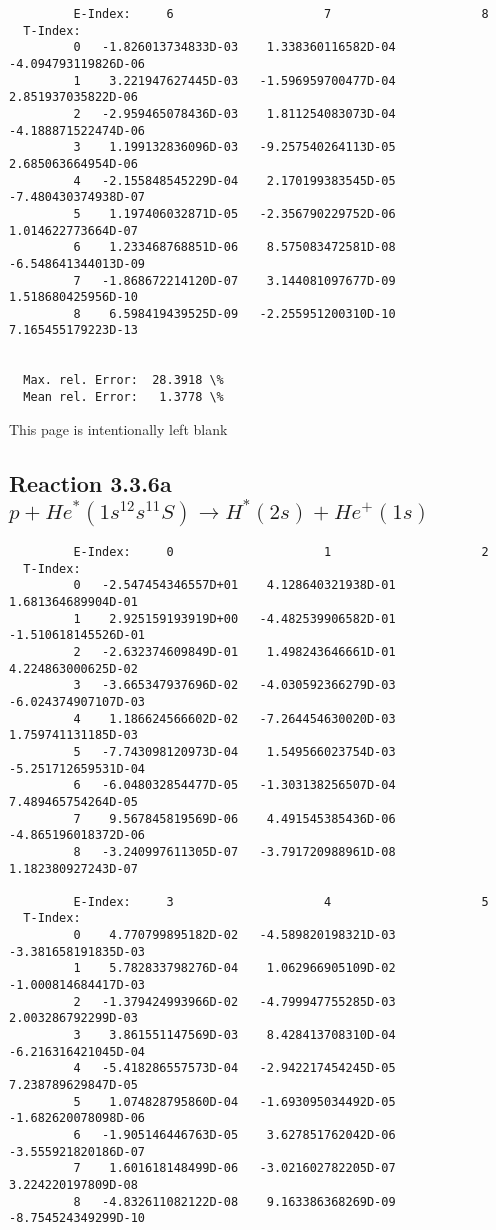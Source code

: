 \documentclass[12pt,dvipdfmx]{article}
\begin{document}
{\begin{small}
\begin{verbatim}
         E-Index:     6                     7                     8
  T-Index:
         0   -1.826013734833D-03    1.338360116582D-04   -4.094793119826D-06
         1    3.221947627445D-03   -1.596959700477D-04    2.851937035822D-06
         2   -2.959465078436D-03    1.811254083073D-04   -4.188871522474D-06
         3    1.199132836096D-03   -9.257540264113D-05    2.685063664954D-06
         4   -2.155848545229D-04    2.170199383545D-05   -7.480430374938D-07
         5    1.197406032871D-05   -2.356790229752D-06    1.014622773664D-07
         6    1.233468768851D-06    8.575083472581D-08   -6.548641344013D-09
         7   -1.868672214120D-07    3.144081097677D-09    1.518680425956D-10
         8    6.598419439525D-09   -2.255951200310D-10    7.165455179223D-13


  Max. rel. Error:  28.3918 \%
  Mean rel. Error:   1.3778 \%
\end{verbatim}\end{small}

\newpage
This page is intentionally left blank
\newpage
\subsection{
Reaction 3.3.6a  $ p + He^*(1s^12s^11S) \rightarrow H^*(2s) + He^+(1s) $
}


\begin{small}\begin{verbatim}
         E-Index:     0                     1                     2
  T-Index:
         0   -2.547454346557D+01    4.128640321938D-01    1.681364689904D-01
         1    2.925159193919D+00   -4.482539906582D-01   -1.510618145526D-01
         2   -2.632374609849D-01    1.498243646661D-01    4.224863000625D-02
         3   -3.665347937696D-02   -4.030592366279D-03   -6.024374907107D-03
         4    1.186624566602D-02   -7.264454630020D-03    1.759741131185D-03
         5   -7.743098120973D-04    1.549566023754D-03   -5.251712659531D-04
         6   -6.048032854477D-05   -1.303138256507D-04    7.489465754264D-05
         7    9.567845819569D-06    4.491545385436D-06   -4.865196018372D-06
         8   -3.240997611305D-07   -3.791720988961D-08    1.182380927243D-07

         E-Index:     3                     4                     5
  T-Index:
         0    4.770799895182D-02   -4.589820198321D-03   -3.381658191835D-03
         1    5.782833798276D-04    1.062966905109D-02   -1.000814684417D-03
         2   -1.379424993966D-02   -4.799947755285D-03    2.003286792299D-03
         3    3.861551147569D-03    8.428413708310D-04   -6.216316421045D-04
         4   -5.418286557573D-04   -2.942217454245D-05    7.238789629847D-05
         5    1.074828795860D-04   -1.693095034492D-05   -1.682620078098D-06
         6   -1.905146446763D-05    3.627851762042D-06   -3.555921820186D-07
         7    1.601618148499D-06   -3.021602782205D-07    3.224220197809D-08
         8   -4.832611082122D-08    9.163386368269D-09   -8.754524349299D-10


\end{verbatim}
\end{small}}
\end{document}
